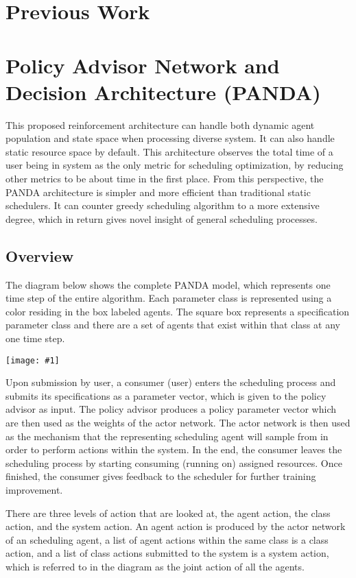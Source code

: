 \documentclass{article}
\theoremstyle{definition}
\theoremstyle{remark}
\newcommand{\addpic}[1]{\texttt{[image: \#1]}}
\begin{document}
	\section{Previous Work}

	\section{Policy Advisor Network and Decision Architecture (PANDA)}

	This proposed reinforcement architecture can handle both dynamic agent population and state space when processing diverse system. It can also handle static resource space by default. This architecture observes the total time of a user being in system as the only metric for scheduling optimization, by reducing other metrics to be about time in the first place. From this perspective, the PANDA architecture is simpler and more efficient than traditional static schedulers. It can counter greedy scheduling algorithm to a more extensive degree, which in return gives novel insight of general scheduling processes.

		\subsection{Overview}

		The diagram below shows the complete PANDA model, which represents one time step of the entire algorithm. Each parameter class is represented using a color residing in the box labeled agents. The square box represents a specification parameter class and there are a set of agents that exist within that class at any one time step.

		\addpic{figures/general_diagram.png}

		Upon submission by user, a consumer (user) enters the scheduling process and submits its specifications as a parameter vector, which is given to the policy advisor as input. The policy advisor produces a policy parameter vector which are then used as the weights of the actor network. The actor network is then used as the mechanism that the representing scheduling agent will sample from in order to perform actions within the system. In the end, the consumer leaves the scheduling process by starting consuming (running on) assigned resources. Once finished, the consumer gives feedback to the scheduler for further training improvement.

		There are three levels of action that are looked at, the agent action, the class action, and the system action. An agent action is produced by the actor network of an scheduling agent, a list of agent actions within the same class is a class action, and a list of class actions submitted to the system is a system action, which is referred to in the diagram as the joint action of all the agents.
\end{document}

